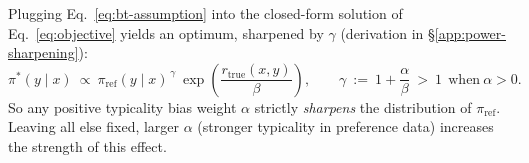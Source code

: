 Plugging Eq.~\ref{eq:bt-assumption} 
into the closed-form solution of Eq.~\ref{eq:objective} \citep{rafailov2024directpreferenceoptimizationlanguage}  yields an optimum, sharpened by $\gamma$ (derivation in \S\ref{app:power-sharpening}):
\begin{equation}
\pi^*(y\mid x)\ \propto\ \pi_{\mathrm{ref}}(y\mid x)^{\,\gamma}\ \exp\!\left(\frac{r_{\text{true}}(x,y)}{\beta}\right),\qquad
\gamma\ :=\ 1+\frac{\alpha}{\beta}\ >\ 1\ \ \text{when}\ \alpha>0.
\label{eq:power}
\end{equation}
So any positive typicality bias weight $\alpha$ strictly \emph{sharpens} the distribution of $\pi_{\text{ref}}$. Leaving all else fixed, larger $\alpha$ (stronger typicality in preference data) increases the strength of this effect.

